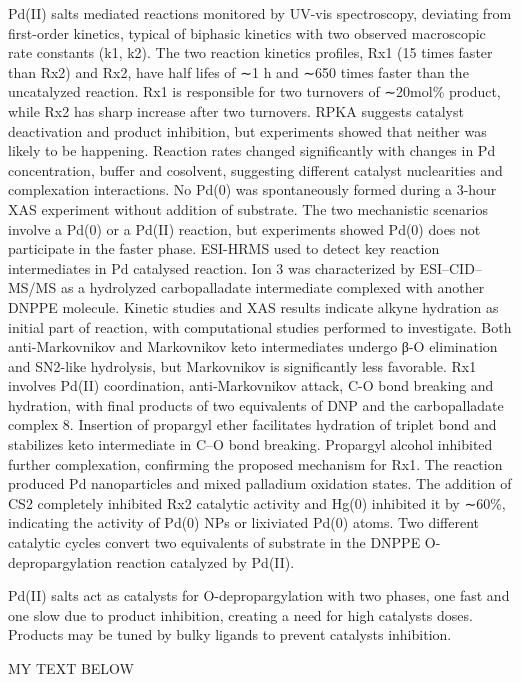 Pd(II) salts mediated reactions monitored by UV-vis spectroscopy, deviating from first-order kinetics, typical of biphasic kinetics with two observed macroscopic rate constants (k1, k2).
The two reaction kinetics profiles, Rx1 (15 times faster than Rx2) and Rx2, have half lifes of ∼1 h and ∼650 times faster than the uncatalyzed reaction.
Rx1 is responsible for two turnovers of ∼20mol\% product, while Rx2 has sharp increase after two turnovers.
RPKA suggests catalyst deactivation and product inhibition, but experiments showed that neither was likely to be happening.
Reaction rates changed significantly with changes in Pd concentration, buffer and cosolvent, suggesting different catalyst nuclearities and complexation interactions.
No Pd(0) was spontaneously formed during a 3-hour XAS experiment without addition of substrate.
The two mechanistic scenarios involve a Pd(0) or a Pd(II) reaction, but experiments showed Pd(0) does not participate in the faster phase.
ESI-HRMS used to detect key reaction intermediates in Pd catalysed reaction.
Ion 3 was characterized by ESI–CID–MS/MS as a hydrolyzed carbopalladate intermediate complexed with another DNPPE molecule.
Kinetic studies and XAS results indicate alkyne hydration as initial part of reaction, with computational studies performed to investigate.
Both anti-Markovnikov and Markovnikov keto intermediates undergo β-O elimination and SN2-like hydrolysis, but Markovnikov is significantly less favorable.
Rx1 involves Pd(II) coordination, anti-Markovnikov attack, C-O bond breaking and hydration, with final products of two equivalents of DNP and the carbopalladate complex 8.
Insertion of propargyl ether facilitates hydration of triplet bond and stabilizes keto intermediate in C–O bond breaking.
Propargyl alcohol inhibited further complexation, confirming the proposed mechanism for Rx1.
The reaction produced Pd nanoparticles and mixed palladium oxidation states.
The addition of CS2 completely inhibited Rx2 catalytic activity and Hg(0) inhibited it by ∼60\%, indicating the activity of Pd(0) NPs or lixiviated Pd(0) atoms.
Two different catalytic cycles convert two equivalents of substrate in the DNPPE O-depropargylation reaction catalyzed by Pd(II).

Pd(II) salts act as catalysts for O-depropargylation with two phases, one fast and one slow due to product inhibition, creating a need for high catalysts doses.
Products may be tuned by bulky ligands to prevent catalysts inhibition.

MY TEXT BELOW

